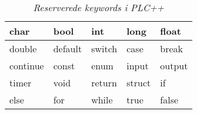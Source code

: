 

\begin{table}[H]
\centering
\footnotesize
\begin{tabular}{|l|l|l|l|l|}
\hline
char     & bool    & int    & long   & float  \\ \hline
double   & default & switch & case   & break  \\ \hline
continue & const   & enum   & input  & output \\ \hline
timer    & void    & return & struct & if     \\ \hline
else     & for     & while  & true   & false  \\ \hline

\end{tabular}
	\caption{\textit{Reserverede keywords i PLC++}}
    \label{tab:keywords}
\end{table}